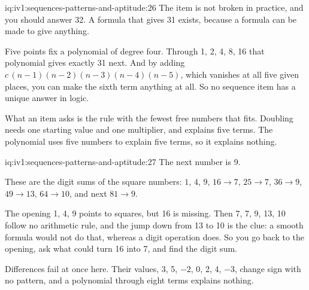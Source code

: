 \begin{solution}{iq:iv1:sequences-patterns-and-aptitude:26}
The item is not broken in practice, and you should answer 32. A formula that gives 31 exists, because a formula can be made to give anything.

Five points fix a polynomial of degree four. Through 1, 2, 4, 8, 16 that polynomial gives exactly 31 next. And by adding $c\,(n - 1)(n - 2)(n - 3)(n - 4)(n - 5)$, which vanishes at all five given places, you can make the sixth term anything at all. So no sequence item has a unique answer in logic.

What an item asks is the rule with the fewest free numbers that fits. Doubling needs one starting value and one multiplier, and explains five terms. The polynomial uses five numbers to explain five terms, so it explains nothing.

\end{solution}

\enlargethispage{-3\baselineskip}%
\begin{solution}{iq:iv1:sequences-patterns-and-aptitude:27}
The next number is 9.

These are the digit sums of the square numbers: $1$, $4$, $9$, $16 \to 7$, $25 \to 7$, $36 \to 9$, $49 \to 13$, $64 \to 10$, and next $81 \to 9$.

The opening 1, 4, 9 points to squares, but 16 is missing. Then 7, 7, 9, 13, 10 follow no arithmetic rule, and the jump down from 13 to 10 is the clue: a smooth formula would not do that, whereas a digit operation does. So you go back to the opening, ask what could turn 16 into 7, and find the digit sum.

Differences fail at once here. Their values, 3, 5, $-2$, 0, 2, 4, $-3$, change sign with no pattern, and a polynomial through eight terms explains nothing.

\end{solution}

